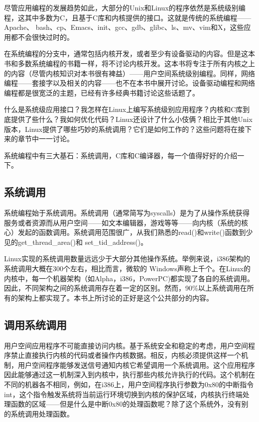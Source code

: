 尽管应用编程的发展趋势如此，大部分的Unix和Linux的程序依然是系统级别编程，这其中多数为C，且基于C库和内核提供的接口。这就是传统的系统编程——Apache、 bash、cp、Emacs、init、gcc、gdb、glibc、ls、mv、vim和X，这些应用都不会很快过时的。

在系统编程的分支中，通常包括内核开发，或者至少有设备驱动的内容。但是这本书和多数系统编程的书籍一样，将不讨论内核开发。这本书将专注于所有内核之上的内容（尽管内核知识对本书很有裨益）——用户空间系统级别编程。同样，网络编程——套接字以及相关的内容——也不在本书中展开讨论。设备驱动编程和网络编程都是很宽泛的主题，已经有许多经典书籍讨论这些话题了。

什么是系统级应用接口？我怎样在Linux上编写系统级别应用程序？内核和C库到底提供了些什么？我如何优化代码？Linux还设计了什么小伎俩？相比于其他Unix版本，Linux提供了哪些巧妙的系统调用？它们是如何工作的？这些问题将在接下来的章节中一一讨论。

系统编程中有三大基石：系统调用，C库和C编译器，每一个值得好好的介绍一下。 

\subsection{系统调用}
系统编程始于系统调用。系统调用（通常简写为syscalls）是为了从操作系统获得服务或者资源而从用户空间——如文本编辑器，游戏等等——向内核（系统的核心）发起的函数调用。系统调用范围很广，从我们熟悉的read()和write()函数到少见的get\_thread\_area()和 set\_tid\_address()。

Linux实现的系统调用数量远远少于大部分其他操作系统。举例来说，i386架构的系统调用大概在300个左右，相比而言，微软的 Windows声称上千个。在Linux的内核中，每一个机器架构（如Alpha，i386，PowerPC)都实现了各自的系统调用。因此，不同架构之间的系统调用存在着一定的区别。然而，90\%以上系统调用在所有的架构上都实现了。本书上所讨论的正好是这个公共部分的内容。 

\subsection{调用系统调用}

用户空间应用程序不可能直接访问内核。基于系统安全和稳定的考虑，用户空间程序禁止直接执行内核的代码或者操作内核数据。相反，内核必须提供这样一个机制，用户空间程序能够发送信号通知内核它希望调用一个系统调用。这个应用程序因此能够通过这一机制深入到内核中，执行那些内核允许执行的代码。这个机制在不同的机器各不相同，例如，在i386上，用户空间程序执行参数为0x80的中断指令int，这个指令触发系统将当前运行环境切换到内核的保护区域，内核执行终端处理函数的区域——但是什么是中断0x80的处理函数呢？除了这个系统外，没有别的系统调用处理函数。

